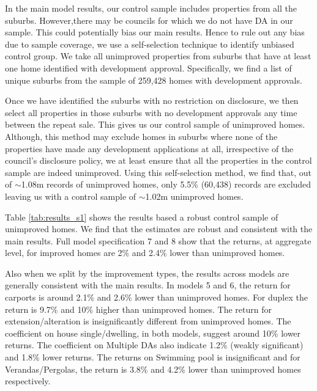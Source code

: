 \documentclass[AEJ,reqno, draftmode]{AEA} %
\begin{document}
In the main model results, our control sample includes properties from all the suburbs. However,there may be councils for which we do not have DA in our sample. This could potentially bias our main results. Hence to rule out any bias due to sample coverage, we use a self-selection technique to identify unbiased control group. We take all unimproved properties from suburbs that have at least one home identified with development approval. Specifically, we find a list of unique suburbs from the sample of 259,428 homes with development approvals.

Once we have identified the suburbs with no restriction on disclosure, we then select all properties in those suburbs with no development approvals any time between the repeat sale. This gives us our control sample of unimproved homes. Although, this method may exclude homes in suburbs where none of the properties have made any development applications at all, irrespective of the council's disclosure policy, we at least ensure that all the properties in the control sample are indeed unimproved. Using this self-selection method, we find that, out of $\sim$1.08m records of unimproved homes, only 5.5\% (60,438) records are excluded leaving us with a control sample of $\sim$1.02m unimproved homes. 

Table \ref{tab:results_s1} shows the results based a robust control sample of unimproved homes. We find that the estimates are robust and consistent with the main results. Full model specification 7 and 8 show that the returns, at aggregate level, for improved homes are 2\% and 2.4\% lower than unimproved homes. 

Also when we split by the improvement types, the results across models are generally consistent with the main results. In models 5 and 6, the return for carports is around 2.1\% and 2.6\% lower than unimproved homes. For duplex the return is 9.7\% and 10\% higher than unimproved homes. The return for extension/alteration is insignificantly different from unimproved homes. The coefficient on house single/dwelling, in both models, suggest around 10\% lower returns. The coefficient on Multiple DAs also indicate 1.2\% (weakly significant) and 1.8\% lower returns. The returns on Swimming pool is insignificant and for Verandas/Pergolas, the return is 3.8\% and 4.2\% lower than unimproved homes respectively.
\end{document}

